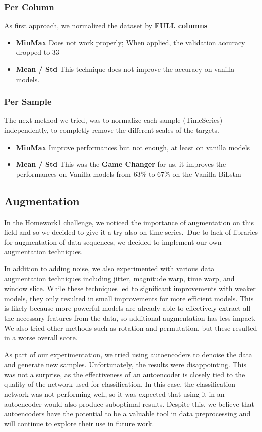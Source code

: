 \documentclass[11pt]{article}
\begin{document}
\subsubsection{Per Column}
As first approach, we normalized the dataset by \textbf{FULL columns}
\begin{itemize}
  \item \textbf{MinMax} Does not work properly; When applied, the validation accuracy dropped to 33%
  \item \textbf{Mean / Std} This technique does not improve the accuracy on vanilla models.
\end{itemize}
\subsubsection{Per Sample}
The next method we tried, was to normalize each sample (TimeSeries) independently, to completly remove the different scales of the targets.
\begin{itemize}
  \item \textbf{MinMax} Improve performances but not enough, at least on vanilla models
  \item \textbf{Mean / Std} This was the \textbf{Game Changer} for us, it improves the performances on Vanilla models from 63\% to 67\% on the Vanilla BiLstm
\end{itemize}
\subsection{Augmentation}
In the Homework1 challenge, we noticed the importance of augmentation on this field and so we decided to give it a try also on time series.\
Due to lack of libraries for augmentation of data sequences, we decided to implement our own augmentation techniques.

In addition to adding noise, we also experimented with various data augmentation techniques including jitter, magnitude warp, time warp, and window slice.
While these techniques led to significant improvements with weaker models, they only resulted in small improvements for more efficient models.
This is likely because more powerful models are already able to effectively extract all the necessary features from the data, so additional augmentation has less impact.
We also tried other methods such as rotation and permutation, but these resulted in a worse overall score.

As part of our experimentation, we tried using autoencoders to denoise the data and generate new samples.
Unfortunately, the results were disappointing.
This was not a surprise, as the effectiveness of an autoencoder is closely tied to the quality of the network used for classification.
In this case, the classification network was not performing well, so it was expected that using it in an autoencoder would also produce suboptimal results.
Despite this, we believe that autoencoders have the potential to be a valuable tool in data preprocessing and will continue to explore their use in future work.
\end{document}
